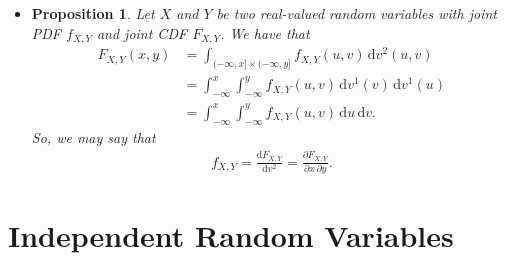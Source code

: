 \documentclass[10pt]{article}
\newtheorem{proposition}[lemma]{Proposition}
\numberwithin{lemma}{section}
\newcommand{\dee}{\mathrm{d}}
\begin{document}
\begin{itemize}
  \item \begin{proposition}
    Let $X$ and $Y$ be two real-valued random variables with joint PDF $f_{X,Y}$ and joint CDF $F_{X,Y}$. We have that
    \begin{align*}
      F_{X,Y}(x,y) 
      &= \int_{(-\infty,x] \times (-\infty,y]} f_{X,Y}(u,v)\, \dee v^2(u,v) \\
      &= \int_{-\infty}^x \int_{-\infty}^y f_{X,Y}(u,v)\, \dee v^1(v)\, \dee v^1(u) \\
      &= \int_{-\infty}^x \int_{-\infty}^y f_{X,Y}(u,v)\, \dee u\,\dee v.
    \end{align*}
    So, we may say that
    \begin{align*}
      f_{X,Y} = \frac{\dee F_{X,Y}}{\dee v^2} = \frac{\partial F_{X,Y}}{\partial x \, \partial y}. 
    \end{align*}
  \end{proposition}
\end{itemize}

\section{Independent Random Variables}
\end{document}
